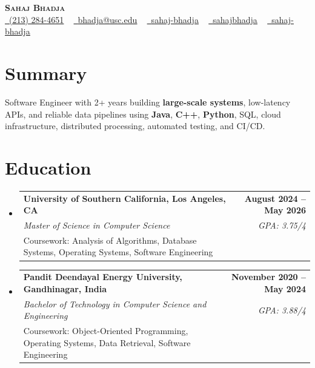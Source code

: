 \documentclass[letterpaper,10pt]{article}
\makeatletter
\newcommand{\sectionGap}{\vspace{-8pt}}
\newcommand{\resumeEduSubheading}[5]{\vspace{-1pt}\item\begin{tabular*}{1.0\textwidth}[t]{l@{\extracolsep{\fill}}r}\textbf{#1} & \textbf{\small #2} \\\textit{\small #3} & \textit{\small #4} \\\small #5 & \\\end{tabular*}\vspace{-4pt}}
\newcommand{\resumeSubHeadingListStart}{\begin{itemize}[leftmargin=0.0in, label={}]}
\newcommand{\resumeSubHeadingListEnd}{\end{itemize}}
\makeatother
\begin{document}
\begin{center}
{\Huge \scshape \textbf{Sahaj Bhadja}} \\ \vspace{1pt}
\small \href{tel:2132844651}{\faPhone\ \underline{(213) 284-4651}} ~ \href{mailto:bhadja@usc.edu}{\raisebox{-0.2\height}\faEnvelope\ \underline{bhadja@usc.edu}} ~
\href{https://www.linkedin.com/in/sahaj-bhadja/}{\raisebox{-0.2\height}\faLinkedin\ \underline{sahaj-bhadja}} ~ \href{https://github.com/SAHAJ-BHADJA}{\raisebox{-0.2\height}\faGithub\ \underline{sahajbhadja}} ~
\href{https://sahaj-bhadja.vercel.app/}{\raisebox{-0.2\height}\faGlobe\ \underline{sahaj-bhadja}}
\end{center}
\vspace{-16pt}
\section{Summary}
\begin{itemize}[leftmargin=0.15in, label={}]
\small{\item{Software Engineer with 2+ years building \textbf{large-scale systems}, low-latency APIs, and reliable data pipelines using \textbf{Java}, \textbf{C++}, \textbf{Python}, SQL, cloud infrastructure, distributed processing, automated testing, and CI/CD.}}
\end{itemize}
\sectionGap
\section{Education}
\resumeSubHeadingListStart
\resumeEduSubheading{University of Southern California, Los Angeles, CA}{August 2024 -- May 2026}{Master of Science in Computer Science}{GPA: 3.75/4}{Coursework: Analysis of Algorithms, Database Systems, Operating Systems, Software Engineering}
\resumeEduSubheading{Pandit Deendayal Energy University, Gandhinagar, India}{November 2020 -- May 2024}{Bachelor of Technology in Computer Science and Engineering}{GPA: 3.88/4}{Coursework: Object-Oriented Programming, Operating Systems, Data Retrieval, Software Engineering}
\resumeSubHeadingListEnd
\sectionGap
\end{document}
